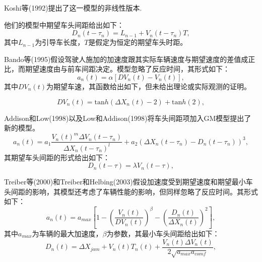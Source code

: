 Koshi等(1992)提出了这一模型的非线性版本\cite{M.Koshi1992}. 
%

他们的模型中期望车头间距给出如下：
\begin{equation}
D_n(t-\tau_n)=L_{n-1}+V_n(t-\tau_n)T,
\end{equation}
其中$L_{n-1}$为引导车长度，$T$是假定为恒定的期望车头时距。

Bando等(1995)假设驾驶人施加的加速度跟其实际车辆速度与期望速度的差值成正比，而期望速度由与前车间距决定\cite{Bando1995}。模型忽略了反应时间，其形式如下：
\begin{equation}
a_n(t)=\alpha[DV_n(t)-V_n(t)],
\end{equation}
其中$DV_n(t)$为期望车速，其函数给出如下，但未给出理论或实际观测的证明。

\begin{equation}
DV_n(t)=\mathrm{tan}h(\Delta X_n(t)-2)+\mathrm{tan}h(2),
\end{equation}


Addison和Low(1998)以及Low和Addison(1998)将车头间距项加入GM模型提出了新的模型\cite{Addison1998,Low1998}。
\begin{equation}
a_n(t)=a_1\frac{V_n(t)^m\Delta V_n(t-\tau_n)}{\Delta X_n(t-\tau_n)^l}+a_2(\Delta X_n(t-\tau_n)-D_n(t-\tau_n))^3,
\end{equation}
其期望车头间距的形式给出如下：
\begin{equation}
D_n(t-\tau)=\lambda V_n(t-\tau),
\end{equation}

Treiber等(2000)和Treiber和Helbing(2003)假设加速度受到期望速度和期望最小车头间距的影响，其模型还考虑了车辆性能的影响，但同样忽略了反应时间\cite{Treiber2000,Treiber2003}。其形式如下：
\begin{equation}
a_n(t)=a_{max}\left[1-\left(\frac{V_n(t)}{DV_n(t)}\right)^\beta-\left(\frac{D_n(t)}{\Delta X_n(t)}\right )^2\right],
\end{equation}
其中$a_{max}$为车辆的最大加速度，$\beta$为参数，其最小车头间距给出如下：
\begin{equation}
D_n(t)=\Delta X_{jam}+V_n(t)T_n(t)+\frac{V_n(t)\Delta V_n(t)}{2\sqrt{a_{max}a_{comf}}},
\end{equation}


